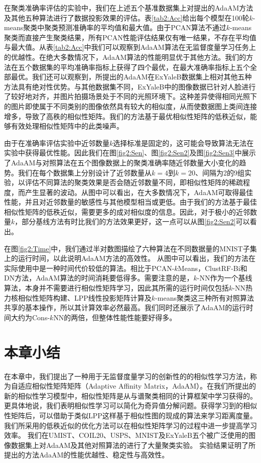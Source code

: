 在聚类准确率评估的实验中，我们在上述五个基准数据集上对提出的AdaAM方法及其他五种算法进行了数据投影效果的评估。表\ref{tab2:Acc}给出每个模型在100轮$k$-means聚类中聚类预测准确率的平均值和最大值。由于PCAN算法不通过$k$-means聚类而直接产生聚类结果，所有PCAN性能评估结果仅有唯一结果，不存在平均值与最大值。从表\ref{tab2:Acc}中我们可以观察到AdaAM算法在无监督度量学习任务上的优越性。在绝大多数情况下，AdaAM算法的性能明显优于其他方法。我们的方法在五个数据集的平均准确率指标上获得了四个最优，在最大准确率指标上五个全部最优。我们还可以观察到，所提出的AdaAM在ExYaleB数据集上相对其他五种方法具有绝对性优势。与其他数据集不同，ExYaleB中的图像数据已针对人脸进行了较好地对齐，并图片拍摄场景处于不同的光照环境下。这种差异使得相同光照下的图片即使属于不同类别的图像依然具有较大的相似度，从而使数据图上类间连接增多，导致了高秩的相似性矩阵。我们的方法基于最优相似性矩阵的低秩近似，能够有效处理相似性矩阵中的此类噪声。

由于在准确率评估实验中近邻数量$k$选择标准是固定的，这可能会导致算法无法在实验中获得最优性能。因此我们在图\ref{fig2:Sen}、图\ref{fig2:Sen2}及图\ref{fig2:Sen3}中展示了AdaAM与对照算法在五个图像数据上的聚类准确率随近邻数量大小变化的趋势。我们在每个数据集上分别设计了近邻数量从$k=4$到$k=20$、间隔为2的9组实验，以评估不同算法的聚类效果是否会随近邻数量不同，即相似性矩阵的稀疏程度，而产生显著的波动。从图中可以看出，在大多数情况下，AdaAM可取得最佳性能，并且对近邻数量的敏感性与其他模型相当或更低。由于我们的方法基于最佳相似性矩阵的低秩近似，需要更多的成对相似度的信息。因此，对于极小的近邻数量$k$，部分基线方法有时比我们的方法效果更好，这一点可以从图\ref{fig2:Sen2}可以看出。

在图\ref{fig2:Time}中，我们通过半对数图描绘了六种算法在不同数据量的MNIST子集上的运行时间，以此说明AdaAM方法的高效性。 从图中可以看出，我们的方法在实际使用中是一种时间代价较低的算法。相比于PCAN-$k$Means，ClustRF-Bi和DN方法，AdaAM算法的时间消耗要低得多。需要注意的是，$k$-NN作为一个基线算法，本身并不需要进行相似性矩阵学习，因此其所需的运行时间仅包括$k$-NN热力核相似性矩阵构建、LPP线性投影矩阵计算及$k$-means聚类这三种所有对照算法共享的基本操作，所以其计算效率必然最高。我们同时还展示了AdaAM的运行时间大约为Cons-$k$NN的两倍，但整体性能性能要好得多。

\section{本章小结}
在本章中，我们提出了一种用于无监督度量学习的创新性的的相似性学习方法，称为自适应相似性矩阵矩阵（Adaptive Affinity Matrix，AdaAM）。在我们所提出的新的相似性学习模型中，相似性矩阵是从与谱聚类相同的计算框架中学习获得的。 更具体地说，我们表明相似性学习可以简化为奇异值分解问题。获得学习到的相似性矩阵后，可以借助于类似LPP这样基于相似性图的现成的算法来学习距离度量。我们所采用的低秩近似的优化方法可以在相似性矩阵学习的过程中进一步提高学习效率。
我们在UMIST、COIL20、USPS、MNIST及ExYaleB五个被广泛使用的图像数据集上对AdaAM及其他对照算法的进行了大量聚类实验。
实验结果证明了所提出的方法AdaAM的性能优越性、稳定性与高效性。